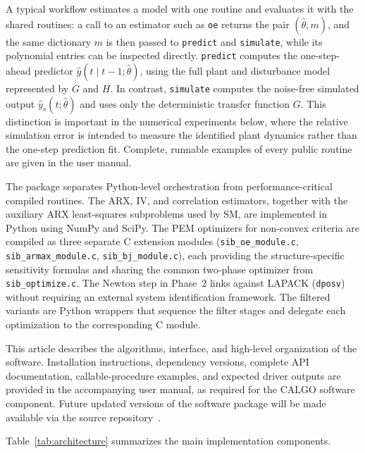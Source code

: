 \documentclass[acmsmall,screen,review]{acmart}
\begin{document}
A typical workflow estimates a model with one routine and evaluates it with
the shared routines: a call to an estimator such as \texttt{oe} returns the
pair $(\hat\theta, m)$, and the same dictionary $m$ is then passed to
\texttt{predict} and \texttt{simulate}, while its polynomial entries can be
inspected directly.  \texttt{predict} computes the one-step-ahead predictor
\(\hat{y}(t \mid t-1;\hat\theta)\), using the full plant and disturbance model
represented by \(G\) and \(H\).  In contrast, \texttt{simulate} computes the
noise-free simulated output \(\hat{y}_s(t;\hat\theta)\) and uses only the
deterministic transfer function \(G\).  This distinction is important in the
numerical experiments below, where the relative simulation error is intended to
measure the identified plant dynamics rather than the one-step prediction fit.
Complete, runnable examples of every public routine are given in the user
manual.

The package separates Python-level orchestration from performance-critical
compiled routines.  The ARX, IV, and correlation estimators, together with the
auxiliary ARX least-squares subproblems used by SM, are implemented in Python
using NumPy and SciPy.  The PEM optimizers for non-convex criteria
are compiled as three separate C extension modules
(\texttt{sib\_oe\_module.c}, \texttt{sib\_armax\_module.c},
\texttt{sib\_bj\_module.c}), each providing the structure-specific
sensitivity formulas and sharing the common two-phase optimizer from
\texttt{sib\_optimize.c}.  The Newton step in Phase~2 links against
LAPACK (\texttt{dposv}) without requiring an external system identification
framework.  The filtered variants are Python wrappers that sequence the
filter stages and delegate each optimization to the corresponding C module.

This article describes the algorithms, interface, and high-level organization
of the software.  Installation instructions, dependency versions, complete API
documentation, callable-procedure examples, and expected driver outputs are
provided in the accompanying user manual, as required for the CALGO software
component.  Future updated versions of the software package will be made
available via the source repository~\cite{pysib_repo}.

Table~\ref{tab:architecture} summarizes the main implementation components.
\end{document}
